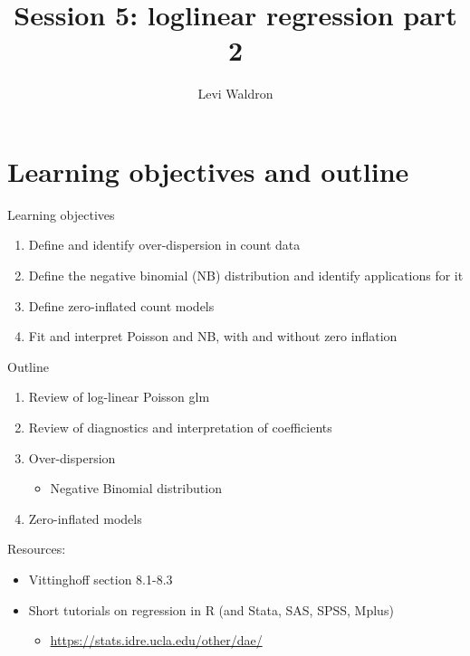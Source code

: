 \documentclass[
  ignorenonframetext,
]{beamer}
\title{Session 5: loglinear regression part 2}
\author{Levi Waldron}
\date{}
\institute{CUNY SPH Biostatistics 2}
\providecommand{\tightlist}{%
  \setlength{\itemsep}{0pt}\setlength{\parskip}{0pt}}
\begin{document}
\frame{\titlepage}

\hypertarget{learning-objectives-and-outline}{%
\section{Learning objectives and
outline}\label{learning-objectives-and-outline}}

\begin{frame}{Learning objectives}
\protect\hypertarget{learning-objectives}{}

\begin{enumerate}
\tightlist
\item
  Define and identify over-dispersion in count data
\item
  Define the negative binomial (NB) distribution and identify
  applications for it
\item
  Define zero-inflated count models
\item
  Fit and interpret Poisson and NB, with and without zero inflation
\end{enumerate}

\end{frame}

\begin{frame}{Outline}
\protect\hypertarget{outline}{}

\begin{enumerate}
\tightlist
\item
  Review of log-linear Poisson glm
\item
  Review of diagnostics and interpretation of coefficients
\item
  Over-dispersion

  \begin{itemize}
  \tightlist
  \item
    Negative Binomial distribution
  \end{itemize}
\item
  Zero-inflated models
\end{enumerate}

Resources:

\begin{itemize}
\tightlist
\item
  Vittinghoff section 8.1-8.3
\item
  Short tutorials on regression in R (and Stata, SAS, SPSS, Mplus)

  \begin{itemize}
  \tightlist
  \item
    \url{https://stats.idre.ucla.edu/other/dae/}
  \end{itemize}
\end{itemize}

\end{frame}
\end{document}
